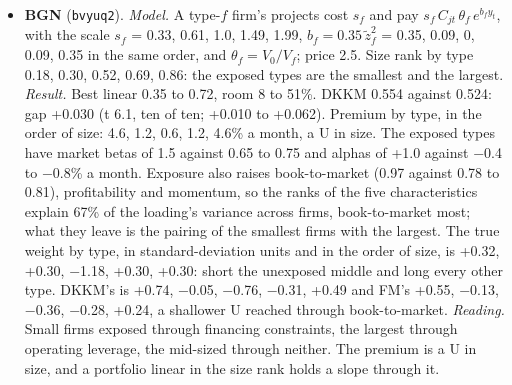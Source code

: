 \documentclass[11pt]{article}
\begin{document}
\begin{itemize}
\item \textbf{BGN} (\texttt{bvyuq2}). \emph{Model.} A type-$f$ firm's projects cost $s_f$ and pay $s_f\,C_{jt}\,\theta_f\,e^{b_f y_t}$, with the scale $s_f$ = 0.33, 0.61, 1.0, 1.49, 1.99, $b_f = 0.35\,\tilde z_f^2$ = 0.35, 0.09, 0, 0.09, 0.35 in the same order, and $\theta_f = V_0/V_f$; price 2.5. Size rank by type 0.18, 0.30, 0.52, 0.69, 0.86: the exposed types are the smallest and the largest. \emph{Result.} Best linear 0.35 to 0.72, room 8 to 51\%. DKKM 0.554 against 0.524: gap +0.030 (t 6.1, ten of ten; +0.010 to +0.062). Premium by type, in the order of size: 4.6, 1.2, 0.6, 1.2, 4.6\% a month, a U in size. The exposed types have market betas of 1.5 against 0.65 to 0.75 and alphas of +1.0 against $-$0.4 to $-$0.8\% a month. Exposure also raises book-to-market (0.97 against 0.78 to 0.81), profitability and momentum, so the ranks of the five characteristics explain 67\% of the loading's variance across firms, book-to-market most; what they leave is the pairing of the smallest firms with the largest. The true weight by type, in standard-deviation units and in the order of size, is +0.32, +0.30, $-$1.18, +0.30, +0.30: short the unexposed middle and long every other type. DKKM's is +0.74, $-$0.05, $-$0.76, $-$0.31, +0.49 and FM's +0.55, $-$0.13, $-$0.36, $-$0.28, +0.24, a shallower U reached through book-to-market. \emph{Reading.} Small firms exposed through financing constraints, the largest through operating leverage, the mid-sized through neither. The premium is a U in size, and a portfolio linear in the size rank holds a slope through it.

\end{itemize}
\end{document}
